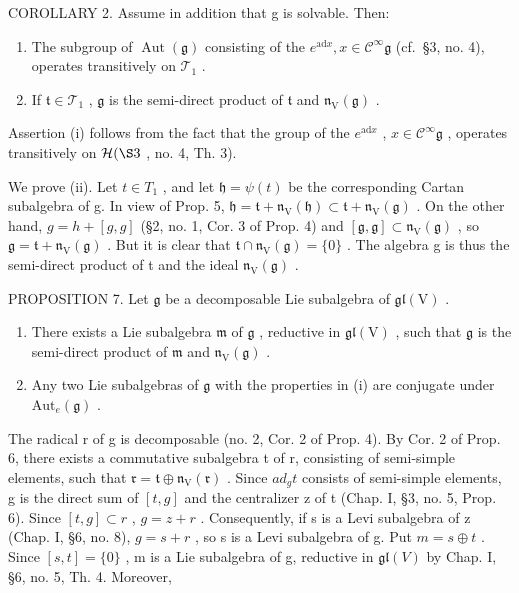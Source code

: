 COROLLARY 2. Assume in addition that g is solvable. Then:

\begin{enumerate}
\def\labelenumi{(\roman{enumi})}
\item
  The subgroup of \(\operatorname{Aut}(\mathfrak{g})\) consisting of the \(e^{\mathrm{ad}x}, x \in \mathcal{C}^{\infty}\mathfrak{g}\) (cf.~§3, no. 4), operates transitively on \(\mathcal{T}_1\) .
\item
  If \(\mathfrak{t} \in \mathcal{T}_1\) , \(\mathfrak{g}\) is the semi-direct product of \(\mathfrak{t}\) and \(\mathfrak{n}_{\mathrm{V}}(\mathfrak{g})\) .
\end{enumerate}

Assertion (i) follows from the fact that the group of the \(e^{\mathrm{ad}x}\) , \(x \in \mathcal{C}^{\infty}\mathfrak{g}\) , operates transitively on \(\mathcal{H}(\S 3\) , no. 4, Th. 3).

We prove (ii). Let \(t \in T_{1}\) , and let \(\mathfrak{h} = \psi(t)\) be the corresponding Cartan subalgebra of g. In view of Prop. 5, \(\mathfrak{h} = \mathfrak{t} + \mathfrak{n}_{\mathrm{V}}(\mathfrak{h}) \subset \mathfrak{t} + \mathfrak{n}_{\mathrm{V}}(\mathfrak{g})\) . On the other hand, \(g = h + [g, g]\) (§2, no. 1, Cor. 3 of Prop. 4) and \([\mathfrak{g}, \mathfrak{g}] \subset \mathfrak{n}_{\mathrm{V}}(\mathfrak{g})\) , so \(\mathfrak{g} = \mathfrak{t} + \mathfrak{n}_{\mathrm{V}}(\mathfrak{g})\) . But it is clear that \(\mathfrak{t} \cap \mathfrak{n}_{\mathrm{V}}(\mathfrak{g}) = \{0\}\) . The algebra g is thus the semi-direct product of t and the ideal \(\mathfrak{n}_{\mathrm{V}}(\mathfrak{g})\) .

PROPOSITION 7. Let \(\mathfrak{g}\) be a decomposable Lie subalgebra of \(\mathfrak{gl}(\mathrm{V})\) .

\begin{enumerate}
\def\labelenumi{(\roman{enumi})}
\item
  There exists a Lie subalgebra \(\mathfrak{m}\) of \(\mathfrak{g}\) , reductive in \(\mathfrak{gl}(\mathrm{V})\) , such that \(\mathfrak{g}\) is the semi-direct product of \(\mathfrak{m}\) and \(\mathfrak{n}_{\mathrm{V}}(\mathfrak{g})\) .
\item
  Any two Lie subalgebras of \(\mathfrak{g}\) with the properties in (i) are conjugate under \(\mathrm{Aut}_e(\mathfrak{g})\) .
\end{enumerate}

The radical r of g is decomposable (no. 2, Cor. 2 of Prop. 4). By Cor. 2 of Prop. 6, there exists a commutative subalgebra t of r, consisting of semi-simple elements, such that \(\mathfrak{r} = \mathfrak{t} \oplus \mathfrak{n}_{\mathrm{V}}(\mathfrak{r})\) . Since \(ad_{g}t\) consists of semi-simple elements, g is the direct sum of \([t, g]\) and the centralizer z of t (Chap. I, §3, no. 5, Prop. 6). Since \([t, g] \subset r\) , \(g = z + r\) . Consequently, if s is a Levi subalgebra of z (Chap. I, §6, no. 8), \(g = s + r\) , so s is a Levi subalgebra of g. Put \(m = s \oplus t\) . Since \([s, t] = \{0\}\) , m is a Lie subalgebra of g, reductive in \(\mathfrak{gl}(V)\) by Chap. I, §6, no. 5, Th. 4. Moreover,

